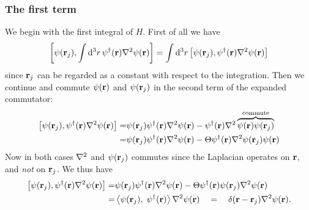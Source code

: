 \documentclass[11pt,letter, swedish, english
]{article}
\begin{document}
\subsubsection{The first term}
We begin with the first integral of $H$. First of all we have
\begin{equation}
\comm{\psi(\vb{r}_j)}{\int\rd^3r\,
\psi^\dagger(\vb{r})\laplacian\psi(\vb{r})}=
\int\rd^3r\,
\comm{\psi(\vb{r}_j)}
{\psi^\dagger(\vb{r})\laplacian\psi(\vb{r})}
\end{equation}
since $\vb{r}_j$ can be regarded as a constant with respect to the
integration. Then we continue and commute $\psi(\vb{r})$ and
$\psi(\vb{r}_j)$ in the second term of the expanded commutator:
\begin{equation}
\begin{aligned}
\comm{\psi(\vb{r}_j)}
{\psi^\dagger(\vb{r})\laplacian\psi(\vb{r})}
=&\psi(\vb{r}_j)\psi^\dagger(\vb{r})\laplacian\psi(\vb{r})
-\psi^\dagger(\vb{r})\laplacian
\commute{\psi(\vb{r})\psi(\vb{r}_j)}\\
=&\psi(\vb{r}_j)\psi^\dagger(\vb{r})\laplacian\psi(\vb{r})
 -\Theta\psi^\dagger(\vb{r})\laplacian\psi(\vb{r}_j)\psi(\vb{r})
\end{aligned}
\end{equation}
Now in both cases $\laplacian$ and $\psi(\vb{r}_j)$ commutes since the
Laplacian operates on $\vb{r}$, and \emph{not} on $\vb{r}_j$. We thus have
\begin{equation}
\begin{aligned}
\comm{\psi(\vb{r}_j)}
{\psi^\dagger(\vb{r})\laplacian\psi(\vb{r})}
=&\psi(\vb{r}_j)\psi^\dagger(\vb{r})\laplacian\psi(\vb{r})
-\Theta\psi^\dagger(\vb{r})\psi(\vb{r}_j)\laplacian\psi(\vb{r})\\
=&\scomm{\psi(\vb{r}_j)}{\psi^\dagger(\vb{r})}
\laplacian\psi(\vb{r})%
\quad=\quad
\delta(\vb{r}-\vb{r}_j)\laplacian\psi(\vb{r}).
\end{aligned}
\end{equation}
\end{document}
